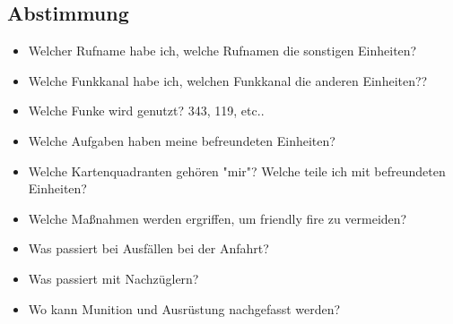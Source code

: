 \subsection{Abstimmung}
	\begin{itemize}
		\item 	Welcher Rufname habe ich, welche Rufnamen die sonstigen Einheiten?
		\item 	Welche Funkkanal habe ich, welchen Funkkanal die anderen Einheiten??
		\item 	Welche Funke wird genutzt? 343, 119, etc..
		\item 	Welche Aufgaben haben meine befreundeten Einheiten?
		\item 	Welche Kartenquadranten gehören "mir"? Welche teile ich mit befreundeten Einheiten?
		\item 	Welche Maßnahmen werden ergriffen, um friendly fire zu vermeiden?
		\item 	Was passiert bei Ausfällen bei der Anfahrt?
		\item 	Was passiert mit Nachzüglern?
		\item 	Wo kann Munition und Ausrüstung nachgefasst werden?
	\end{itemize}